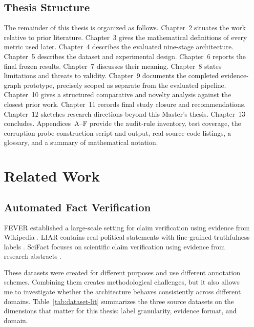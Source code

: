 \documentclass[12pt,a4paper,openany]{report}
\begin{document}
\section{Thesis Structure}
The remainder of this thesis is organized as follows. Chapter~2 situates the work relative to prior literature. Chapter~3 gives the mathematical definitions of every metric used later. Chapter~4 describes the evaluated nine-stage architecture. Chapter~5 describes the dataset and experimental design. Chapter~6 reports the final frozen results. Chapter~7 discusses their meaning. Chapter~8 states limitations and threats to validity. Chapter~9 documents the completed evidence-graph prototype, precisely scoped as separate from the evaluated pipeline. Chapter~10 gives a structured comparative and novelty analysis against the closest prior work. Chapter~11 records final study closure and recommendations. Chapter~12 sketches research directions beyond this Master's thesis. Chapter~13 concludes. Appendices~A--F provide the audit-rule inventory, test coverage, the corruption-probe construction script and output, real source-code listings, a glossary, and a summary of mathematical notation.

\chapter{Related Work}
\section{Automated Fact Verification}
FEVER established a large-scale setting for claim verification using evidence from Wikipedia \citep{thorne2018fever}. LIAR contains real political statements with fine-grained truthfulness labels \citep{wang2017liar}. SciFact focuses on scientific claim verification using evidence from research abstracts \citep{wadden2020fact}.

These datasets were created for different purposes and use different annotation schemes. Combining them creates methodological challenges, but it also allows me to investigate whether the architecture behaves consistently across different domains. Table~\ref{tab:dataset-lit} summarizes the three source datasets on the dimensions that matter for this thesis: label granularity, evidence format, and domain.
\end{document}

